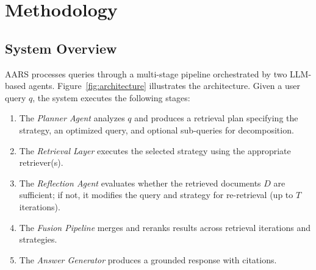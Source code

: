 \documentclass[runningheads]{llncs}
\begin{document}
\section{Methodology}
\label{sec:methodology}

\subsection{System Overview}

AARS processes queries through a multi-stage pipeline orchestrated by two LLM-based agents. Figure~\ref{fig:architecture} illustrates the architecture. Given a user query $q$, the system executes the following stages:

\begin{enumerate}
    \item The \textit{Planner Agent} analyzes $q$ and produces a retrieval plan specifying the strategy, an optimized query, and optional sub-queries for decomposition.
    \item The \textit{Retrieval Layer} executes the selected strategy using the appropriate retriever(s).
    \item The \textit{Reflection Agent} evaluates whether the retrieved documents $D$ are sufficient; if not, it modifies the query and strategy for re-retrieval (up to $T$ iterations).
    \item The \textit{Fusion Pipeline} merges and reranks results across retrieval iterations and strategies.
    \item The \textit{Answer Generator} produces a grounded response with citations.
\end{enumerate}
\end{document}
